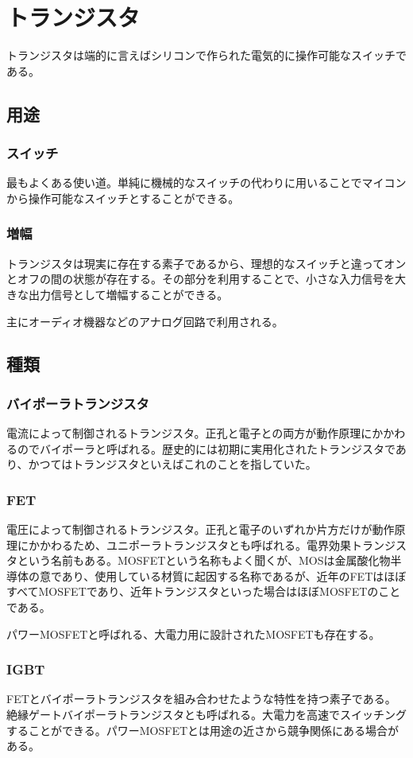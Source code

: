 \documentclass[a4paper,titlepage,here]{ujarticle}
\begin{document}
\section{トランジスタ}
トランジスタは端的に言えばシリコンで作られた電気的に操作可能なスイッチである。
\subsection{用途}
\subsubsection{スイッチ}
最もよくある使い道。単純に機械的なスイッチの代わりに用いることでマイコンから操作可能なスイッチとすることができる。
\subsubsection{増幅}
トランジスタは現実に存在する素子であるから、理想的なスイッチと違ってオンとオフの間の状態が存在する。その部分を利用することで、小さな入力信号を大きな出力信号として増幅することができる。

主にオーディオ機器などのアナログ回路で利用される。
\subsection{種類}
\subsubsection{バイポーラトランジスタ}
電流によって制御されるトランジスタ。正孔と電子との両方が動作原理にかかわるのでバイポーラと呼ばれる。歴史的には初期に実用化されたトランジスタであり、かつてはトランジスタといえばこれのことを指していた。
\subsubsection{FET}
電圧によって制御されるトランジスタ。正孔と電子のいずれか片方だけが動作原理にかかわるため、ユニポーラトランジスタとも呼ばれる。電界効果トランジスタという名前もある。MOSFETという名称もよく聞くが、MOSは金属酸化物半導体の意であり、使用している材質に起因する名称であるが、近年のFETはほぼすべてMOSFETであり、近年トランジスタといった場合はほぼMOSFETのことである。

パワーMOSFETと呼ばれる、大電力用に設計されたMOSFETも存在する。
\subsubsection{IGBT}
FETとバイポーラトランジスタを組み合わせたような特性を持つ素子である。絶縁ゲートバイポーラトランジスタとも呼ばれる。大電力を高速でスイッチングすることができる。パワーMOSFETとは用途の近さから競争関係にある場合がある。
\end{document}

